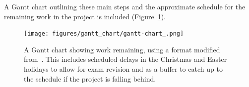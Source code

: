 \documentclass[12pt]{article}
\begin{document}
    A Gantt chart outlining these main steps and the approximate schedule for the remaining work in the project is included (Figure~\ref{fig:gantt-chart_}).

    \begin{landscape}
        \begin{figure}[p] %
            \centering
            \texttt{[image: figures/gantt\_chart/gantt-chart\_.png]}
            \caption{A Gantt chart showing work remaining, using a format modified from~\cite{DataCampGanttChart2021}. This includes scheduled delays in the Christmas and Easter holidays to allow for exam revision and as a buffer to catch up to the schedule if the project is falling behind.}
            \label{fig:gantt-chart_}
        \end{figure}
    \end{landscape}

    \FloatBarrier





    \newpage
    \printbibliography
    \newpage
    
\end{document}
